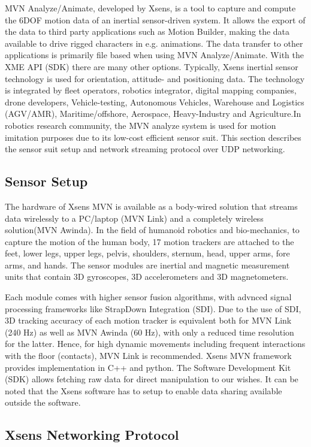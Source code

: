 MVN Analyze/Animate, developed by Xsens, is a tool to capture and compute the 6DOF motion data of an inertial sensor-driven system. It allows the export of the data to third party 
applications such as Motion Builder, making the data available to drive rigged characters in e.g. animations. The data transfer to other applications is primarily file based when using MVN Analyze/Animate. With the XME API (SDK) there are many other options.
Typically, Xsens inertial sensor technology is used for orientation, attitude- and positioning data. The technology is integrated by fleet operators, robotics integrator, digital mapping companies, drone developers, Vehicle-testing, Autonomous Vehicles, Warehouse 
and Logistics (AGV/AMR), Maritime/offshore, Aerospace, Heavy-Industry and Agriculture.In robotics research community, the MVN analyze system is used for motion imitation purposes due to its low-cost efficient sensor suit. This section describes the sensor suit setup and 
network streaming protocol over UDP networking.


\subsection{Sensor Setup}
The hardware of Xsens MVN is available as a body-wired solution that streams data wirelessly to a PC/laptop (MVN Link) and a completely wireless solution(MVN Awinda). 
In the field of humanoid robotics and bio-mechanics, to capture the motion of the human body, 17 motion trackers are attached to the feet, lower legs, upper legs, pelvis, shoulders, sternum, head, upper arms, fore arms, and hands. The sensor modules are inertial and magnetic measurement units that contain 3D gyroscopes, 3D accelerometers and 3D magnetometers.

Each module comes with higher sensor fusion algorithms, with advnced signal processing frameworks like StrapDown Integration (SDI). Due to the use of SDI, 3D tracking accuracy of each motion tracker is equivalent both for MVN Link (240 Hz) as well as MVN Awinda (60 Hz), 
with only a reduced time resolution for the latter. Hence, for high dynamic movements including frequent interactions with the floor (contacts), MVN Link is recommended. Xsens MVN framework provides implementation in C++ and python. The Software Development Kit (SDK) allows 
fetching raw data for direct manipulation to our wishes. It can be noted that the Xsens software has to setup to enable data sharing available outside the software.

\subsection{Xsens Networking Protocol}

